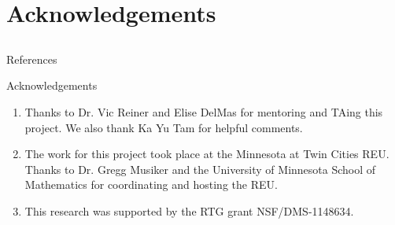 \documentclass{beamer}
\theoremstyle{remark}
\newcommand\rk{\operatorname{rk}}
\begin{document}



\section{Acknowledgements}
\subsection{}

\begin{frame}{References}
\nocite{quotients_stanley}
\nocite{algebraic_stanley}
\nocite{pak}


\end{frame}


\begin{frame}{Acknowledgements}
\begin{enumerate}
\item Thanks to Dr. Vic Reiner and Elise DelMas for mentoring and TAing this project. We also thank Ka Yu Tam for helpful comments. 
\item The work for this project took place at the Minnesota at Twin Cities REU.  Thanks to Dr. Gregg Musiker and the University of Minnesota School of Mathematics for coordinating and hosting the REU.
\item This research was supported by the RTG grant NSF/DMS-1148634.
\end{enumerate}
\end{frame}
\end{document}
